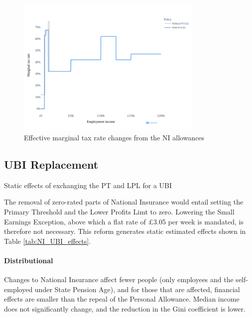 \documentclass{article}
\begin{document}
    \begin{figure}
        \centering
        \includegraphics[width=0.8\textwidth]{images/fig_9.png}
        \caption{Effective marginal tax rate changes from the NI allowances}
        \label{fig:NI_mtr_effects}
    \end{figure}

    \subsection{UBI Replacement}

    \begin{table}
        \centering
        
        \caption{Static effects of exchanging the PT and LPL for a UBI}
        \label{tab:NI_UBI_effects}
    \end{table}

    The removal of zero-rated parts of National Insurance would entail setting the Primary Threshold and the Lower Profits Limt to zero. Lowering the Small Earnings Exception, above which a flat rate of £3.05 per week is mandated, is therefore not necessary. This reform generates static estimated effects shown in Table \ref{tab:NI_UBI_effects}.

    \paragraph{Distributional} Changes to National Insurance affect fewer people (only employees and the self-employed under State Pension Age), and for those that are affected, financial effects are smaller than the repeal of the Personal Allowance. Median income does not significantly change, and the reduction in the Gini coefficient is lower. 
\end{document}
